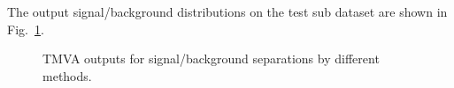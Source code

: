 The output signal/background distributions on the test sub dataset are shown in Fig.~\ref{output_separation_allE}.
\begin{figure}[htbp]
	\centering
	\caption{TMVA outputs for signal/background separations by different methods.}
	\label{output_separation_allE}
\end{figure}

